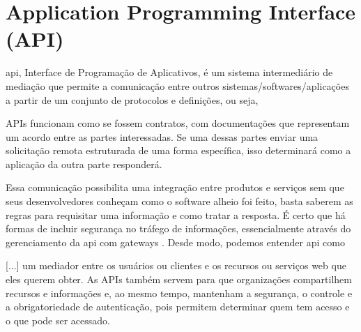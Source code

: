 \section{Application Programming Interface (API)} %
\Gls{api}, Interface de Programação de Aplicativos, é um sistema intermediário de mediação que permite a comunicação entre outros sistemas/softwares/aplicações a partir de um conjunto de protocolos e definições, ou seja,
\begin{quoting}[rightmargin=0cm,leftmargin=4cm]
	\begin{SingleSpace}
		{\footnotesize APIs funcionam como se fossem contratos, com documentações que representam um acordo entre as partes interessadas. Se uma dessas partes enviar uma solicitação remota estruturada de uma forma específica, isso determinará como a aplicação da outra parte responderá.\cite{redhat_api}}
	\end{SingleSpace}
\end{quoting}
Essa comunicação possibilita uma integração entre produtos e serviços sem que seus desenvolvedores conheçam como o software alheio foi feito, basta saberem as regras para requisitar uma informação e como tratar a resposta. É certo que há formas de incluir segurança no tráfego de informações, essencialmente através do gerenciamento da \ac{api} com gateways \cite{redhat_api}. Desde modo, podemos entender \ac{api} como
\begin{quoting}[rightmargin=0cm,leftmargin=4cm]
	\begin{SingleSpace}
		{\footnotesize [...] um mediador entre os usuários ou clientes e os recursos ou serviços web que eles querem obter. As APIs também servem para que organizações compartilhem recursos e informações e, ao mesmo tempo, mantenham a segurança, o controle e a obrigatoriedade de autenticação, pois permitem determinar quem tem acesso e o que pode ser acessado. \cite{redhat_api}}
	\end{SingleSpace}
\end{quoting}

